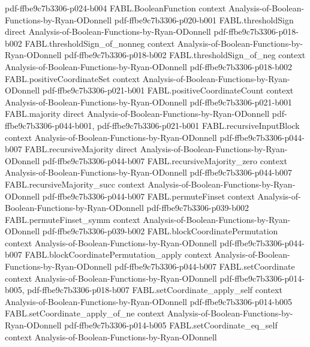 \begin{theorem}
{    pdf-ffbe9c7b3306-p024-b004}
\proofstep
  {FABL.BooleanFunction}
  {context}
  {Analysis-of-Boolean-Functions-by-Ryan-ODonnell}
  {pdf-ffbe9c7b3306-p020-b001}
\proofstep
  {FABL.thresholdSign}
  {direct}
  {Analysis-of-Boolean-Functions-by-Ryan-ODonnell}
  {pdf-ffbe9c7b3306-p018-b002}
\proofstep
  {FABL.thresholdSign_of_nonneg}
  {context}
  {Analysis-of-Boolean-Functions-by-Ryan-ODonnell}
  {pdf-ffbe9c7b3306-p018-b002}
\proofstep
  {FABL.thresholdSign_of_neg}
  {context}
  {Analysis-of-Boolean-Functions-by-Ryan-ODonnell}
  {pdf-ffbe9c7b3306-p018-b002}
\proofstep
  {FABL.positiveCoordinateSet}
  {context}
  {Analysis-of-Boolean-Functions-by-Ryan-ODonnell}
  {pdf-ffbe9c7b3306-p021-b001}
\proofstep
  {FABL.positiveCoordinateCount}
  {context}
  {Analysis-of-Boolean-Functions-by-Ryan-ODonnell}
  {pdf-ffbe9c7b3306-p021-b001}
\proofstep
  {FABL.majority}
  {direct}
  {Analysis-of-Boolean-Functions-by-Ryan-ODonnell}
  {pdf-ffbe9c7b3306-p044-b001,
    pdf-ffbe9c7b3306-p021-b001}
\proofstep
  {FABL.recursiveInputBlock}
  {context}
  {Analysis-of-Boolean-Functions-by-Ryan-ODonnell}
  {pdf-ffbe9c7b3306-p044-b007}
\proofstep
  {FABL.recursiveMajority}
  {direct}
  {Analysis-of-Boolean-Functions-by-Ryan-ODonnell}
  {pdf-ffbe9c7b3306-p044-b007}
\proofstep
  {FABL.recursiveMajority_zero}
  {context}
  {Analysis-of-Boolean-Functions-by-Ryan-ODonnell}
  {pdf-ffbe9c7b3306-p044-b007}
\proofstep
  {FABL.recursiveMajority_succ}
  {context}
  {Analysis-of-Boolean-Functions-by-Ryan-ODonnell}
  {pdf-ffbe9c7b3306-p044-b007}
\proofstep
  {FABL.permuteFinset}
  {context}
  {Analysis-of-Boolean-Functions-by-Ryan-ODonnell}
  {pdf-ffbe9c7b3306-p039-b002}
\proofstep
  {FABL.permuteFinset_symm}
  {context}
  {Analysis-of-Boolean-Functions-by-Ryan-ODonnell}
  {pdf-ffbe9c7b3306-p039-b002}
\proofstep
  {FABL.blockCoordinatePermutation}
  {context}
  {Analysis-of-Boolean-Functions-by-Ryan-ODonnell}
  {pdf-ffbe9c7b3306-p044-b007}
\proofstep
  {FABL.blockCoordinatePermutation_apply}
  {context}
  {Analysis-of-Boolean-Functions-by-Ryan-ODonnell}
  {pdf-ffbe9c7b3306-p044-b007}
\proofstep
  {FABL.setCoordinate}
  {context}
  {Analysis-of-Boolean-Functions-by-Ryan-ODonnell}
  {pdf-ffbe9c7b3306-p014-b005,
    pdf-ffbe9c7b3306-p018-b007}
\proofstep
  {FABL.setCoordinate_apply_self}
  {context}
  {Analysis-of-Boolean-Functions-by-Ryan-ODonnell}
  {pdf-ffbe9c7b3306-p014-b005}
\proofstep
  {FABL.setCoordinate_apply_of_ne}
  {context}
  {Analysis-of-Boolean-Functions-by-Ryan-ODonnell}
  {pdf-ffbe9c7b3306-p014-b005}
\proofstep
  {FABL.setCoordinate_eq_self}
  {context}
  {Analysis-of-Boolean-Functions-by-Ryan-ODonnell}

\end{theorem}
